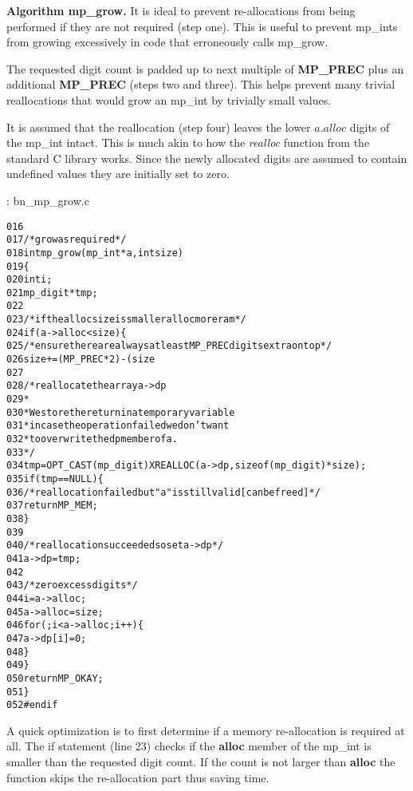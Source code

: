 \documentclass[b5paper]{book}
\begin{document}
\textbf{Algorithm mp\_grow.}
It is ideal to prevent re-allocations from being performed if they are not required (step one).  This is useful to 
prevent mp\_ints from growing excessively in code that erroneously calls mp\_grow.  

The requested digit count is padded up to next multiple of \textbf{MP\_PREC} plus an additional \textbf{MP\_PREC} (steps two and three).  
This helps prevent many trivial reallocations that would grow an mp\_int by trivially small values.  

It is assumed that the reallocation (step four) leaves the lower $a.alloc$ digits of the mp\_int intact.  This is much 
akin to how the \textit{realloc} function from the standard C library works.  Since the newly allocated digits are 
assumed to contain undefined values they are initially set to zero.

\vspace{+3mm}\begin{small}
\hspace{-5.1mm}{\bf File}: bn\_mp\_grow.c
\vspace{-3mm}
\begin{alltt}
016   
017   /* grow as required */
018   int mp_grow (mp_int * a, int size)
019   \{
020     int     i;
021     mp_digit *tmp;
022   
023     /* if the alloc size is smaller alloc more ram */
024     if (a->alloc < size) \{
025       /* ensure there are always at least MP_PREC digits extra on top */
026       size += (MP_PREC * 2) - (size % MP_PREC);
027   
028       /* reallocate the array a->dp
029        *
030        * We store the return in a temporary variable
031        * in case the operation failed we don't want
032        * to overwrite the dp member of a.
033        */
034       tmp = OPT_CAST(mp_digit) XREALLOC (a->dp, sizeof (mp_digit) * size);
035       if (tmp == NULL) \{
036         /* reallocation failed but "a" is still valid [can be freed] */
037         return MP_MEM;
038       \}
039   
040       /* reallocation succeeded so set a->dp */
041       a->dp = tmp;
042   
043       /* zero excess digits */
044       i        = a->alloc;
045       a->alloc = size;
046       for (; i < a->alloc; i++) \{
047         a->dp[i] = 0;
048       \}
049     \}
050     return MP_OKAY;
051   \}
052   #endif
\end{alltt}
\end{small}

A quick optimization is to first determine if a memory re-allocation is required at all.  The if statement (line 23) checks
if the \textbf{alloc} member of the mp\_int is smaller than the requested digit count.  If the count is not larger than \textbf{alloc}
the function skips the re-allocation part thus saving time.
\end{document}
